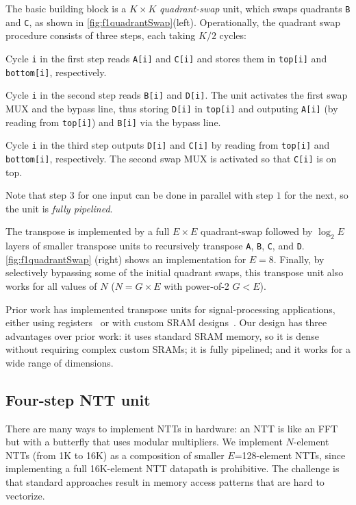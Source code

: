 The basic building block is a $K \times K$ \textit{quadrant-swap} unit, which
swaps quadrants \texttt{B} and \texttt{C}, as shown in
\autoref{fig:f1quadrantSwap}(left). Operationally, the quadrant swap procedure
consists of three steps, each taking $K/2$ cycles:
\begin{compactenum}
\item Cycle \texttt{i} in the first step reads \texttt{A[i]} and \texttt{C[i]}
    and stores them in \texttt{top[i]} and \texttt{bottom[i]}, respectively.
\item Cycle \texttt{i} in the second step reads \texttt{B[i]} and
    \texttt{D[i]}. The unit activates the first swap MUX and the bypass line,
    thus storing \texttt{D[i]} in \texttt{top[i]} and outputing \texttt{A[i]}
    (by reading from \texttt{top[i]}) and \texttt{B[i]} via the bypass line.
\item Cycle \texttt{i} in the third step outputs \texttt{D[i]} and
    \texttt{C[i]} by reading from \texttt{top[i]} and \texttt{bottom[i]},
    respectively. The second swap MUX is activated so that \texttt{C[i]} is on
    top.
\end{compactenum}

Note that step $3$ for one input can be done in parallel with step $1$ for the
next, so the unit is \emph{fully pipelined}.

The transpose is implemented by a full $E \times E$ quadrant-swap followed by
$\log_2E$ layers of smaller transpose units to recursively transpose
\texttt{A}, \texttt{B}, \texttt{C}, and \texttt{D}.
\autoref{fig:f1quadrantSwap} (right) shows an implementation for $E=8$.
Finally, by selectively bypassing some of the initial quadrant swaps, this
transpose unit also works for all values of $N$ ($N=G\times E$ with power-of-2
$G < E$).

Prior work has implemented transpose units for signal-processing applications,
either using registers~\cite{wang2018pipelined,zhang2020novel} or with custom
SRAM designs~\cite{shang2014single}. Our design has three advantages over prior
work: it uses standard SRAM memory, so it is dense without requiring complex
custom SRAMs; it is fully pipelined; and it works for a wide range of
dimensions.

\subsection{Four-step NTT unit}\label{sec:fourStepNTT}

There are many ways to implement NTTs in hardware: an NTT is like an
FFT~\cite{cooley:moc65:algorithm} but with a butterfly that uses modular
multipliers. We implement $N$-element NTTs (from 1K to 16K) as a composition of
smaller $E$=128-element NTTs, since implementing a full 16K-element NTT
datapath is prohibitive. The challenge is that standard approaches result in
memory access patterns that are hard to vectorize.

